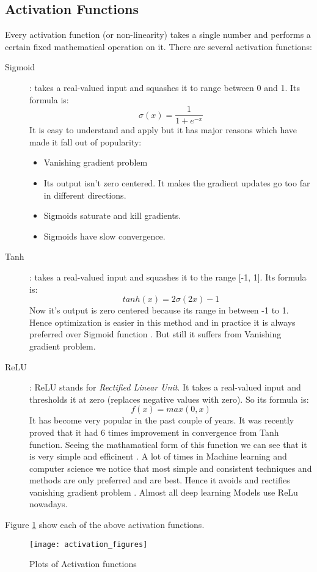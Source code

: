 \documentclass{report}
\begin{document}
\subsection{Activation Functions} 
Every activation function (or non-linearity) takes a single number and performs a certain fixed mathematical operation on it. There are
several activation functions:
\begin{description}
\item[ Sigmoid ] : takes a real-valued input and squashes it to range between 0 and 1. Its formula is:
  \[ \sigma(x) = \frac{1}{1 + e^{-x} } \]
  It is easy to understand and apply but it has major reasons which have made it fall out of popularity:
  \begin{itemize}
  \item Vanishing gradient problem
  \item Its output isn’t zero centered. It makes the gradient updates go too far in different directions.
  \item Sigmoids saturate and kill gradients.
  \item Sigmoids have slow convergence.
  \end{itemize}

\item [ Tanh ] : takes a real-valued input and squashes it to the range [-1, 1]. Its formula is:
  \[ tanh(x) = 2 \sigma(2x) -1 \]
  Now it’s output is zero centered because its range in between -1 to 1. Hence optimization is easier in this method and  in practice it is always preferred over Sigmoid function . But still it suffers from Vanishing gradient problem.

\item[ ReLU ]: ReLU stands for \textit{Rectified Linear Unit}. It takes a real-valued input and thresholds it at zero (replaces negative values with zero). So its formula is:
  \[ f(x) = max(0,x) \]
  It has become very popular in the past couple of years. It was recently proved that it had 6 times improvement in convergence from Tanh
  function. Seeing the mathamatical form of this function we can see that it is very simple and efficinent . A lot of times in Machine
  learning and computer science we notice that most simple and consistent techniques and methods are only preferred and are best.
  Hence it avoids and rectifies vanishing gradient problem . Almost all deep learning Models use ReLu nowadays.
\end{description}

Figure \ref{fig:Activation}  show each of the above activation functions.
\begin{figure}[h]
  \centering
  \texttt{[image: activation\_figures]}
  \caption{Plots of Activation functions}
  \label{fig:Activation}
\end{figure}
\end{document}
